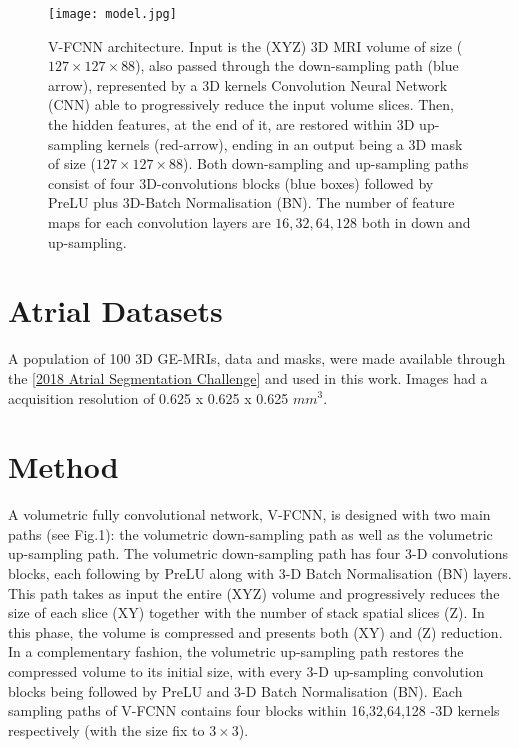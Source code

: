 \documentclass{llncs}
\begin{document}
\begin{figure*}[ht]
\centering
 \texttt{[image: model.jpg]}
   \caption{V-FCNN architecture. Input is the (XYZ) 3D MRI volume of size ($127\times127\times 88$), also passed through the down-sampling path (blue arrow),
represented by a 3D kernels Convolution Neural Network (CNN) able to progressively reduce the input volume slices.
Then, the hidden features, at the end of it, are restored within 3D up-sampling kernels (red-arrow), ending in an output being a 3D mask of size ($127\times127\times 88$). Both down-sampling and up-sampling paths consist of four 3D-convolutions blocks (blue boxes) followed by PreLU plus 3D-Batch Normalisation (BN). The number of feature maps for each convolution layers are $16,32,64,128$ both in down and up-sampling.}
\label{fig:fig1}
\end{figure*}


\section{Atrial Datasets}

A population of 100 3D GE-MRIs, data and masks, were made available through the [\href{http://atriaseg2018.cardiacatlas.org/}{2018 Atrial Segmentation Challenge}] and used in this work. Images had a acquisition resolution of 0.625 x 0.625 x 0.625 $mm^3$. 

\section{Method}

A volumetric fully convolutional network, V-FCNN, is designed with two main paths (see Fig.1): the volumetric down-sampling path as well as the volumetric up-sampling path. The volumetric down-sampling path has four 3-D convolutions blocks, each following by PreLU along with 3-D Batch Normalisation (BN) layers. This path takes as input the entire (XYZ) volume and progressively reduces the size of each slice (XY) together with the number of stack spatial slices (Z). In this phase, the volume is compressed and presents both (XY) and (Z) reduction. 
In a complementary fashion, the volumetric up-sampling path restores the compressed volume to its initial size, with every 3-D up-sampling convolution blocks being followed by PreLU and 3-D Batch Normalisation (BN).
Each sampling paths of V-FCNN contains four blocks within 16,32,64,128 -3D kernels respectively (with the size fix to $3\times3$). 
\end{document}
